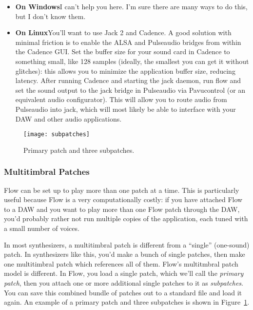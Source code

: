 \documentclass{article}
\begin{document}
\begin{itemize}
\item {\bf On Windows}\quad I can't help you here.  I'm sure there are many ways to do this, but I don't know them.

\item {\bf On Linux}\quad You'll want to use Jack 2 and Cadence. A good solution with minimal friction is to enable the ALSA and Pulseaudio bridges from within the Cadence GUI. Set the buffer size for your sound card in Cadence to something small, like 128 samples (ideally, the smallest you can get it without glitches): this allows you to minimize the application buffer size, reducing latency. After running Cadence and starting the jack daemon, run flow and set the sound output to the jack bridge in Pulseaudio via Pavucontrol (or an equivalent audio configurator). This will allow you to route audio from Pulseaudio into jack, which will most likely be able to interface with your DAW and other audio applications.

\end{itemize}


\begin{figure}[t]
\begin{center}\texttt{[image: subpatches]}\end{center}
\vspace{-3em}
\caption{Primary patch and three subpatches.}
\label{subpatches}
\end{figure}

\subsubsection{Multitimbral Patches}
\label{multitimbral}

Flow can be set up to play more than one patch at a time. This is particularly useful because Flow is a very computationally costly: if you have attached Flow to a DAW and you want to play more than one Flow patch through the DAW, you'd probably rather not run multiple copies of the application, each tuned with a small number of voices.

In most synthesizers, a multitimbral patch is different from a ``single'' (one-sound) patch.  In synthesizers like this, you'd make a bunch of single patches, then make one multitimbral patch which references all of them.  Flow's multitmbral patch model is different.  In Flow, you load a single patch, which we'll call the {\it primary patch}, then you attach one or more additional single patches to it as {\it subpatches}.  You can save this combined bundle of patches out to a standard file and load it again.  An example of a primary patch and three subpatches is shown in Figure~\ref{subpatches}.
\end{document}
